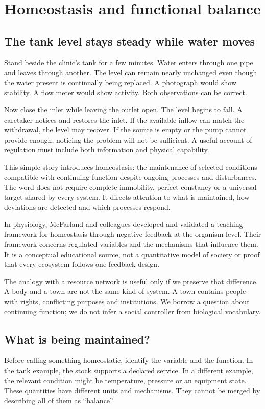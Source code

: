 \chapter{Homeostasis and functional balance}\label{ch:homeostasis}

\section{The tank level stays steady while water moves}
Stand beside the clinic's tank for a few minutes. Water enters through one pipe and leaves through another. The level can remain nearly unchanged even though the water present is continually being replaced. A photograph would show stability. A flow meter would show activity. Both observations can be correct.

Now close the inlet while leaving the outlet open. The level begins to fall. A caretaker notices and restores the inlet. If the available inflow can match the withdrawal, the level may recover. If the source is empty or the pump cannot provide enough, noticing the problem will not be sufficient. A useful account of regulation must include both information and physical capability.

This simple story introduces homeostasis: the maintenance of selected conditions compatible with continuing function despite ongoing processes and disturbances. The word does not require complete immobility, perfect constancy or a universal target shared by every system. It directs attention to what is maintained, how deviations are detected and which processes respond.

In physiology, McFarland and colleagues developed and validated a teaching framework for homeostasis through negative feedback at the organism level. Their framework concerns regulated variables and the mechanisms that influence them. It is a conceptual educational source, not a quantitative model of society or proof that every ecosystem follows one feedback design.\cite{intro-homeostasis}

The analogy with a resource network is useful only if we preserve that difference. A body and a town are not the same kind of system. A town contains people with rights, conflicting purposes and institutions. We borrow a question about continuing function; we do not infer a social controller from biological vocabulary.

\section{What is being maintained?}
Before calling something homeostatic, identify the variable and the function. In the tank example, the stock supports a declared service. In a different example, the relevant condition might be temperature, pressure or an equipment state. These quantities have different units and mechanisms. They cannot be merged by describing all of them as ``balance''.

